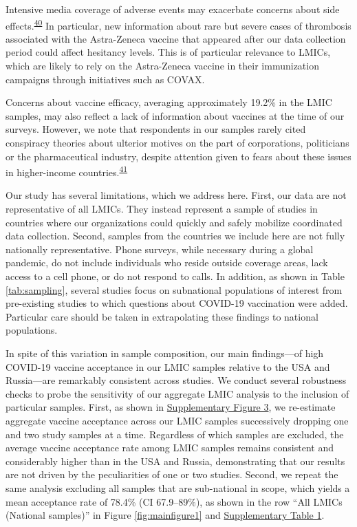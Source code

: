 \documentclass[
  12pt,
]{article}
\begin{document}
Intensive media coverage of adverse events may exacerbate concerns about side effects.\textsuperscript{\protect\hyperlink{ref-stein2017golden}{40}} In particular, new information about rare but severe cases of thrombosis associated with the Astra-Zeneca vaccine that appeared after our data collection period could affect hesitancy levels. This is of particular relevance to LMICs, which are likely to rely on the Astra-Zeneca vaccine in their immunization campaigns through initiatives such as COVAX.

Concerns about vaccine efficacy, averaging approximately 19.2\% in the LMIC samples, may also reflect a lack of information about vaccines at the time of our surveys. However, we note that respondents in our samples rarely cited conspiracy theories about ulterior motives on the part of corporations, politicians or the pharmaceutical industry, despite attention given to fears about these issues in higher-income countries.\textsuperscript{\protect\hyperlink{ref-loomba_measuring_2021}{41}}

Our study has several limitations, which we address here. First, our data are not representative of all LMICs. They instead represent a sample of studies in countries where our organizations could quickly and safely mobilize coordinated data collection. Second, samples from the countries we include here are not fully nationally representative. Phone surveys, while necessary during a global pandemic, do not include individuals who reside outside coverage areas, lack access to a cell phone, or do not respond to calls. In addition, as shown in Table \ref{tab:sampling}, several studies focus on subnational populations of interest from pre-existing studies to which questions about COVID-19 vaccination were added. Particular care should be taken in extrapolating these findings to national populations.

In spite of this variation in sample composition, our main findings---of high COVID-19 vaccine acceptance in our LMIC samples relative to the USA and Russia---are remarkably consistent across studies. We conduct several robustness checks to probe the sensitivity of our aggregate LMIC analysis to the inclusion of particular samples. First, as shown in \hyperref[fig:mainloo]{Supplementary Figure 3}, we re-estimate aggregate vaccine acceptance across our LMIC samples successively dropping one and two study samples at a time. Regardless of which samples are excluded, the average vaccine acceptance rate among LMIC samples remains consistent and considerably higher than in the USA and Russia, demonstrating that our results are not driven by the peculiarities of one or two studies. Second, we repeat the same analysis excluding all samples that are sub-national in scope, which yields a mean acceptance rate of 78.4\% (CI 67.9--89\%), as shown in the row ``All LMICs (National samples)'' in Figure \ref{fig:mainfigure1} and \hyperref[tab:maintabledis]{Supplementary Table 1}.
\end{document}
